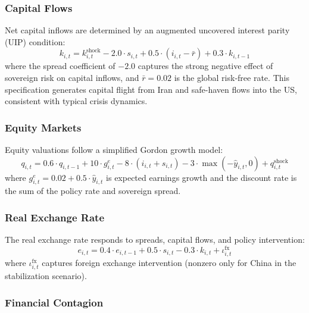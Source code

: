 \documentclass[12pt,a4paper]{article}
\begin{document}
\subsubsection{Capital Flows}

Net capital inflows are determined by an augmented uncovered interest parity (UIP) condition:
\begin{equation}
k_{i,t} = k^{\text{shock}}_{i,t} - 2.0 \cdot s_{i,t} + 0.5 \cdot (i_{i,t} - \bar{r}) + 0.3 \cdot k_{i,t-1}
\label{eq:capital}
\end{equation}
where the spread coefficient of $-2.0$ captures the strong negative effect of sovereign risk on capital inflows, and $\bar{r} = 0.02$ is the global risk-free rate. This specification generates capital flight from Iran and safe-haven flows into the US, consistent with typical crisis dynamics.

\subsubsection{Equity Markets}

Equity valuations follow a simplified Gordon growth model:
\begin{equation}
q_{i,t} = 0.6 \cdot q_{i,t-1} + 10 \cdot g^e_{i,t} - 8 \cdot (i_{i,t} + s_{i,t}) - 3 \cdot \max(-\hat{y}_{i,t}, 0) + q^{\text{shock}}_{i,t}
\label{eq:equity}
\end{equation}
where $g^e_{i,t} = 0.02 + 0.5 \cdot \hat{y}_{i,t}$ is expected earnings growth and the discount rate is the sum of the policy rate and sovereign spread.

\subsubsection{Real Exchange Rate}

The real exchange rate responds to spreads, capital flows, and policy intervention:
\begin{equation}
e_{i,t} = 0.4 \cdot e_{i,t-1} + 0.5 \cdot s_{i,t} - 0.3 \cdot k_{i,t} + \iota^{\text{fx}}_{i,t}
\label{eq:rer}
\end{equation}
where $\iota^{\text{fx}}_{i,t}$ captures foreign exchange intervention (nonzero only for China in the stabilization scenario).

\subsubsection{Financial Contagion}
\end{document}
